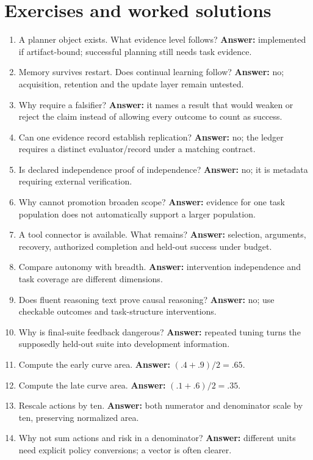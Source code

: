 \section{Exercises and worked solutions}
\begin{enumerate}
\item A planner object exists. What evidence level follows? \textbf{Answer:}
implemented if artifact-bound; successful planning still needs task evidence.
\item Memory survives restart. Does continual learning follow? \textbf{Answer:}
no; acquisition, retention and the update layer remain untested.
\item Why require a falsifier? \textbf{Answer:} it names a result that would
weaken or reject the claim instead of allowing every outcome to count as success.
\item Can one evidence record establish replication? \textbf{Answer:} no;
the ledger requires a distinct evaluator/record under a matching contract.
\item Is declared independence proof of independence? \textbf{Answer:} no;
it is metadata requiring external verification.
\item Why cannot promotion broaden scope? \textbf{Answer:} evidence for one
task population does not automatically support a larger population.
\item A tool connector is available. What remains? \textbf{Answer:} selection,
arguments, recovery, authorized completion and held-out success under budget.
\item Compare autonomy with breadth. \textbf{Answer:} intervention independence
and task coverage are different dimensions.
\item Does fluent reasoning text prove causal reasoning? \textbf{Answer:}
no; use checkable outcomes and task-structure interventions.
\item Why is final-suite feedback dangerous? \textbf{Answer:} repeated tuning
turns the supposedly held-out suite into development information.
\item Compute the early curve area. \textbf{Answer:} $(.4+.9)/2=.65$.
\item Compute the late curve area. \textbf{Answer:} $(.1+.6)/2=.35$.
\item Rescale actions by ten. \textbf{Answer:} both numerator and denominator
scale by ten, preserving normalized area.
\item Why not sum actions and risk in a denominator? \textbf{Answer:}
different units need explicit policy conversions; a vector is often clearer.

\end{enumerate}
